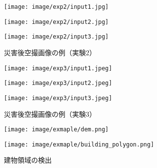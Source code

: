     \begin{figure}[t]
      \begin{minipage}[c]{0.329\hsize}
        \centering
        \texttt{[image: image/exp2/input1.jpg]}
      \end{minipage}
      \begin{minipage}[c]{0.329\hsize}
        \centering
        \texttt{[image: image/exp2/input2.jpg]}
      \end{minipage}
      \begin{minipage}[c]{0.329\hsize}
        \centering
        \texttt{[image: image/exp2/input3.jpg]}
      \end{minipage}
      \caption{災害後空撮画像の例（実験2）}
      \label{空撮画像2}
    \end{figure}

    \begin{figure}[t]
      \begin{minipage}[c]{0.329\hsize}
        \centering
        \texttt{[image: image/exp3/input1.jpeg]}
      \end{minipage}
      \begin{minipage}[c]{0.329\hsize}
        \centering
        \texttt{[image: image/exp3/input2.jpeg]}
      \end{minipage}
      \begin{minipage}[c]{0.329\hsize}
        \centering
        \texttt{[image: image/exp3/input3.jpeg]}
      \end{minipage}
      \caption{災害後空撮画像の例（実験3）}
      \label{空撮画像3}
    \end{figure}

    \begin{figure}[t]
      \begin{minipage}[c]{0.45\hsize}
        \centering
        \texttt{[image: image/exmaple/dem.png]}
      \end{minipage}
      \begin{minipage}[c]{0.45\hsize}
        \centering
        \texttt{[image: image/exmaple/building\_polygon.png]}
      \end{minipage}
      \caption{建物領域の検出}
      \label{基盤地図情報（実験1）}
    \end{figure}

